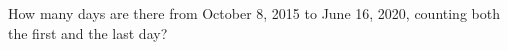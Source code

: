 How many days are there from October 8, 2015 to June 16, 2020, counting both the first and the last day?
